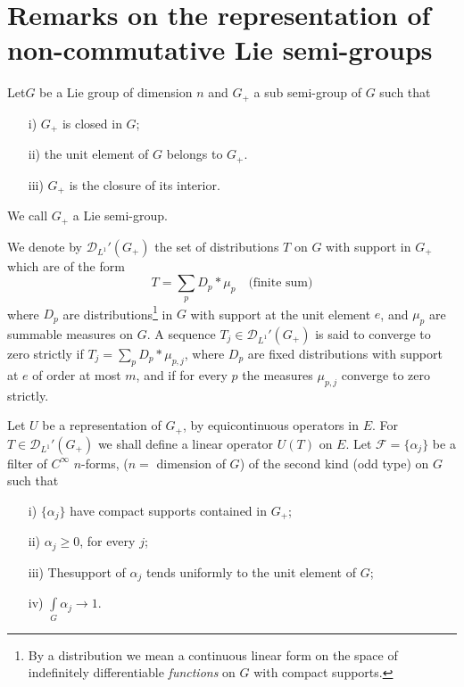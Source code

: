 
\chapter[Remarks on the representation...]{Remarks on the representation of non-commutative Lie
  semi-groups}\label{chap21}

Let\pageoriginale $G$ be a Lie group of dimension $n$ and $G_+$ a sub semi-group of
$G$ such that 
\begin{itemize}
\item [i)] $G_+$ is closed in $G$;
\item [ii)] the unit element of $G$ belongs to $G_+$.
\item [iii)] $G_+$ is the closure of its interior.
\end{itemize}

We call $G_+$ a Lie semi-group.

We denote by $\mathscr{D}_{L^1}'(G_+)$ the set of distributions $T$ on
$G$ with support in $G_+$ which are of the form
$$
T=\sum\limits_{p}D_p*\mu_p \quad \text{(finite sum)}
$$
where $D_p$ are distributions\footnote{By a distribution we mean a
  continuous linear form on the space of indefinitely differentiable
  \emph{functions} on $G$ with compact supports.} 
in $G$ with support at the unit element
$e$, and $\mu_p$ are summable measures on $G$. A sequence $T_j\in
\mathscr{D}_{L^1}'(G_+)$ is said to converge to zero strictly if $T_j=
\sum\limits_p D_p*\mu_{p,j}$, where $D_p$ are fixed distributions with
support at $e$ of order at most $m$, and if for every $p$ the measures
$\mu_{p,j}$ converge to zero strictly.

Let $U$ be a representation of $G_+$, by equicontinuous operators in
$E$. For $T\in\mathscr{D}_{L^1}'(G_+)$ we shall define a linear
operator $U(T)$ on $E$. Let $\mathscr{F}=\{\alpha_j\}$ be a filter of
$C^\infty$ $n$-forms, ($n=$ dimension of $G$) of the second kind (odd
type) on $G$ such that 

\begin{itemize}
\item [i)] $\{\alpha_j\}$ have compact supports contained in $G_+$;
\item [ii)] $\alpha_j\geq 0$, for every $j$;



\item [iii)] The\pageoriginale support of $\alpha_j$ tends uniformly
  to the unit element of $G$;
\item [iv)] $\int\limits_G\alpha_j\to 1$.
\end{itemize}

